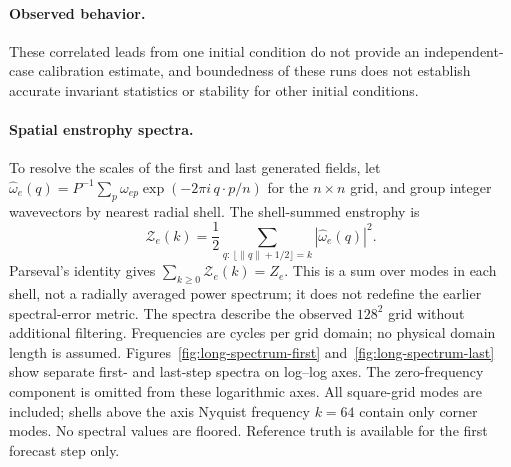 \begin{table}[t]
\caption{Long autonomous rollouts from one history with eight members. Late statistics average the final 512 leads; $Q_{1:95}$ is the ratio of pooled corrected RMS spread to pooled RMSE over the available-reference interval.}
\label{tab:long-maps}
\centering
{}
\end{table}

\paragraph{Observed behavior.}
 These correlated leads from one initial condition do not provide an independent-case calibration estimate, and boundedness of these runs does not establish accurate invariant statistics or stability for other initial conditions.

\paragraph{Spatial enstrophy spectra.}
To resolve the scales of the first and last generated fields, let
$\widehat\omega_e(q)=P^{-1}\sum_p\omega_{ep}\exp(-2\pi i\,q\cdot p/n)$
for the $n\times n$ grid, and group integer wavevectors by nearest radial shell. The shell-summed enstrophy is
\begin{equation}
\mathcal Z_e(k)=\frac12\sum_{q:\,\lfloor\lVert q\rVert+1/2\rfloor=k}
|\widehat\omega_e(q)|^2.
\end{equation}
Parseval's identity gives $\sum_{k\ge0}\mathcal Z_e(k)=Z_e$.
This is a sum over modes in each shell, not a radially averaged power spectrum; it does not redefine the earlier spectral-error metric. The spectra describe the observed $128^2$ grid without additional filtering. Frequencies are cycles per grid domain; no physical domain length is assumed. Figures~\ref{fig:long-spectrum-first} and~\ref{fig:long-spectrum-last} show separate first- and last-step spectra on log--log axes. The zero-frequency component is omitted from these logarithmic axes. All square-grid modes are included; shells above the axis Nyquist frequency $k=64$ contain only corner modes. No spectral values are floored. Reference truth is available for the first forecast step only. 

